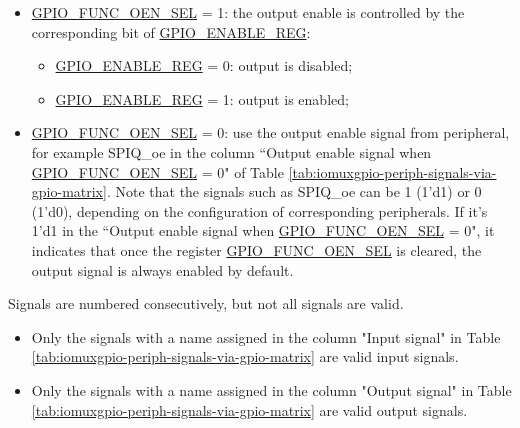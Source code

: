 \documentclass[main\_\_EN.tex]{subfiles}
\begin{document}
\begin{itemize}
    \item \hyperref[fielddesc:GPIOFUNCNOENSEL]{GPIO\_FUNC\_OEN\_SEL} = 1: the output enable is controlled by the corresponding bit  of \hyperref[regdesc:GPIOENABLEREG]{GPIO\_ENABLE\_REG}:
    \begin{itemize}
        \item \hyperref[regdesc:GPIOENABLEREG]{GPIO\_ENABLE\_REG} = 0: output is disabled;
        \item \hyperref[regdesc:GPIOENABLEREG]{GPIO\_ENABLE\_REG} = 1: output is enabled;
    \end{itemize}
    \item \hyperref[fielddesc:GPIOFUNCNOENSEL]{GPIO\_FUNC\_OEN\_SEL} = 0: use the output enable signal from peripheral, for example SPIQ\_oe in the column ``Output enable signal when \hyperref[fielddesc:GPIOFUNCNOENSEL]{GPIO\_FUNC\_OEN\_SEL} = 0" of Table \ref{tab:iomuxgpio-periph-signals-via-gpio-matrix}. Note that the signals such as SPIQ\_oe can be 1 (1'd1) or 0 (1'd0), depending on the configuration of corresponding peripherals. If it's 1'd1 in the ``Output enable signal when \hyperref[fielddesc:GPIOFUNCNOENSEL]{GPIO\_FUNC\_OEN\_SEL} = 0", it indicates that once the register \hyperref[fielddesc:GPIOFUNCNOENSEL]{GPIO\_FUNC\_OEN\_SEL} is cleared, the output signal is always enabled by default.
\end{itemize}

\begin{tiplisting}
Signals are numbered consecutively, but not all signals are valid.
\vspace{-1em}
\begin{itemize}
    \item Only the signals with a name assigned in the column "Input signal" in Table \ref{tab:iomuxgpio-periph-signals-via-gpio-matrix} are valid input signals. 
    \item Only the signals with a name assigned in the column "Output signal" in Table \ref{tab:iomuxgpio-periph-signals-via-gpio-matrix} are valid output signals. 
\end{itemize}
\end{tiplisting}

\begin{landscape}



\end{landscape}
\end{document}
